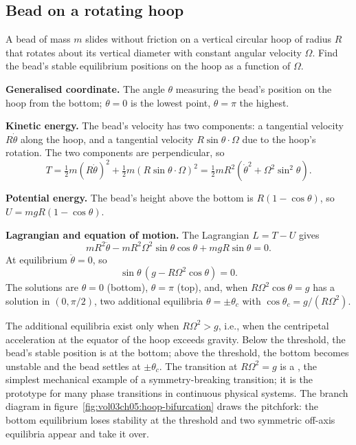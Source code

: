 

\subsection{Bead on a rotating hoop}

A bead of mass $m$ slides without friction on a vertical circular
hoop of radius $R$ that rotates about its vertical diameter with
constant angular velocity $\Omega$. Find the bead's stable
equilibrium positions on the hoop as a function of $\Omega$.

\textbf{Generalised coordinate.} The angle $\theta$ measuring the
bead's position on the hoop from the bottom; $\theta = 0$ is the
lowest point, $\theta = \pi$ the highest.

\textbf{Kinetic energy.} The bead's velocity has two components: a
tangential velocity $R\dot{\theta}$ along the hoop, and a tangential
velocity $R\sin\theta \cdot \Omega$ due to the hoop's rotation. The
two components are perpendicular, so
\[
T = \tfrac{1}{2} m (R\dot{\theta})^2 + \tfrac{1}{2} m (R\sin\theta
\cdot \Omega)^2 = \tfrac{1}{2} m R^2 (\dot{\theta}^2 + \Omega^2
\sin^2\theta).
\]

\textbf{Potential energy.} The bead's height above the bottom is
$R(1 - \cos\theta)$, so $U = m g R (1 - \cos\theta)$.

\textbf{Lagrangian and equation of motion.} The Lagrangian $L = T - U$
gives
\[
m R^2 \ddot{\theta} - m R^2 \Omega^2 \sin\theta \cos\theta + m g R
\sin\theta = 0.
\]
At equilibrium $\ddot{\theta} = 0$, so
\[
\sin\theta \,(g - R \Omega^2 \cos\theta) = 0.
\]
The solutions are $\theta = 0$ (bottom), $\theta = \pi$ (top), and,
when $R\Omega^2 \cos\theta = g$ has a solution in $(0, \pi/2)$, two
additional equilibria $\theta = \pm \theta_c$ with $\cos\theta_c =
g/(R\Omega^2)$.

The additional equilibria exist only when $R\Omega^2 > g$, i.e.,
when the centripetal acceleration at the equator of the hoop exceeds
gravity. Below the threshold, the bead's stable position is at the
bottom; above the threshold, the bottom becomes unstable and the
bead settles at $\pm \theta_c$. The transition at $R\Omega^2 = g$ is
a , the simplest mechanical example of a
symmetry-breaking transition; it is the prototype for many phase
transitions in continuous physical systems. The branch diagram in
figure~\ref{fig:vol03ch05:hoop-bifurcation} draws the pitchfork: the
bottom equilibrium loses stability at the threshold and two symmetric
off-axis equilibria appear and take it over.

